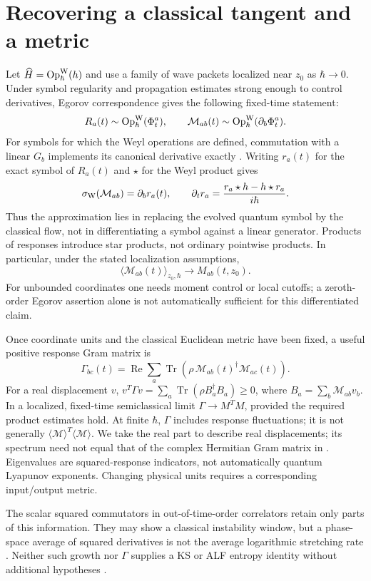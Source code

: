\documentclass[11pt,a4paper]{article}
\newcommand{\Tr}{\operatorname{Tr}}
\newcommand{\Op}{\operatorname{Op}}
\begin{document}
\section{Recovering a classical tangent and a metric}
Let $\widehat H=\Op_\hbar^{\rm W}(h)$ and use a family of wave packets localized near $z_0$ as $\hbar\to0$. Under symbol regularity and propagation estimates strong enough to control derivatives, Egorov correspondence gives the following fixed-time statement:
\[R_a(t)\sim\Op_\hbar^{\rm W}(\Phi_t^a),\qquad\mathcal M_{ab}(t)\sim\Op_\hbar^{\rm W}(\partial_b\Phi_t^a).\]
For symbols for which the Weyl operations are defined, commutation with a linear $G_b$ implements its canonical derivative exactly \cite[Sec.~2.1]{robert}. Writing $r_a(t)$ for the exact symbol of $R_a(t)$ and $\star$ for the Weyl product gives
\[\sigma_{\rm W}(\mathcal M_{ab})=\partial_b r_a(t),\qquad\partial_t r_a=\frac{r_a\star h-h\star r_a}{i\hbar}.\]
Thus the approximation lies in replacing the evolved quantum symbol by the classical flow, not in differentiating a symbol against a linear generator. Products of responses introduce star products, not ordinary pointwise products. In particular, under the stated localization assumptions,
\[\langle\mathcal M_{ab}(t)\rangle_{z_0,\hbar}\longrightarrow M_{ab}(t,z_0).\]
For unbounded coordinates one needs moment control or local cutoffs; a zeroth-order Egorov assertion alone is not automatically sufficient for this differentiated claim.

Once coordinate units and the classical Euclidean metric have been fixed, a useful positive response Gram matrix is
\[\Gamma_{bc}(t)=\operatorname{Re}\sum_a\Tr\!\left(\rho\,\mathcal M_{ab}(t)^\dagger\mathcal M_{ac}(t)\right).\]
For a real displacement $v$, $v^T\Gamma v=\sum_a\Tr(\rho B_a^\dagger B_a)\geq0$, where $B_a=\sum_b\mathcal M_{ab}v_b$. In a localized, fixed-time semiclassical limit $\Gamma\to M^TM$, provided the required product estimates hold. At finite $\hbar$, $\Gamma$ includes response fluctuations; it is not generally $\langle\mathcal M\rangle^T\langle\mathcal M\rangle$. We take the real part to describe real displacements; its spectrum need not equal that of the complex Hermitian Gram matrix in \cite{gharibyan}. Eigenvalues are squared-response indicators, not automatically quantum Lyapunov exponents. Changing physical units requires a corresponding input/output metric.

The scalar squared commutators in out-of-time-order correlators retain only parts of this information. They may show a classical instability window, but a phase-space average of squared derivatives is not the average logarithmic stretching rate \cite{rozenbaum}. Neither such growth nor $\Gamma$ supplies a KS or ALF entropy identity without additional hypotheses \cite{goldfriend}.
\end{document}
